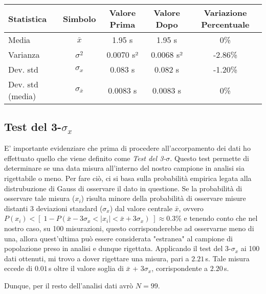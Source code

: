 \documentclass{article}
\begin{document}
\begin{table}[ht]
\centering
\begin{tabular}{lcccc}
		\toprule
			\textbf{Statistica} & \textbf{Simbolo} & \textbf{Valore Prima} & \textbf{Valore Dopo} & \textbf{Variazione Percentuale} \\
		\midrule
			Media & $\bar{x}$ & 1.95 s & 1.95 s & 0\% \\
			Varianza & $\sigma^2$ & 0.0070 s² & 0.0068 s² & -2.86\% \\
			Dev. std & $\sigma_x$ & 0.083 s & 0.082 s & -1.20\% \\
			Dev. std (media) & $\sigma_{\bar{x}}$ & 0.0083 s & 0.0083 s & 0\% \\
		\bottomrule
\end{tabular}
\end{table}

\subsection{Test del 3-$\sigma_{x}$ }
E' importante evidenziare che prima di procedere all'accorpamento dei dati ho effettuato quello che viene definito come \textit{Test del 3-$\sigma$}. Questo test permette di determinare se una data misura all'interno del nostro campione in analisi sia rigettabile o meno. Per fare ciò, ci si basa sulla probabilità empirica legata alla distrubuzione di Gauss di osservare il dato in questione.
\newline\indent
Se la probabilità di osservare tale misura ($x_i$) risulta minore della probabilità di osservare misure distanti 3 deviazioni standard ($\sigma_x$) dal valore centrale $\bar{x}$, ovvero\\$P(x_i) < [\;1 - P(\bar{x} - 3\sigma_{x} < |x_i| < \bar{x} + 3\sigma_{x})\;] \approx 0.3\% $ e tenendo conto che nel nostro caso, su 100 misurazioni, questo corrisponderebbe ad osservarne meno di una, allora quest'ultima può essere considerata "estranea" al campione di popolazione preso in analisi e dunque rigettata.
\newline\newline 
Applicando il test del 3-$\sigma_x$ ai 100 dati ottenuti, mi trovo a dover rigettare una misura, pari a $2.21\,$s. Tale misura eccede di $0.01\,$s oltre il valore soglia di $\bar{x}$ + 3$\sigma_x$, corrispondente a $2.20\,$s.

Dunque, per il resto dell'analisi dati avrò $N = 99$. 
\end{document}
